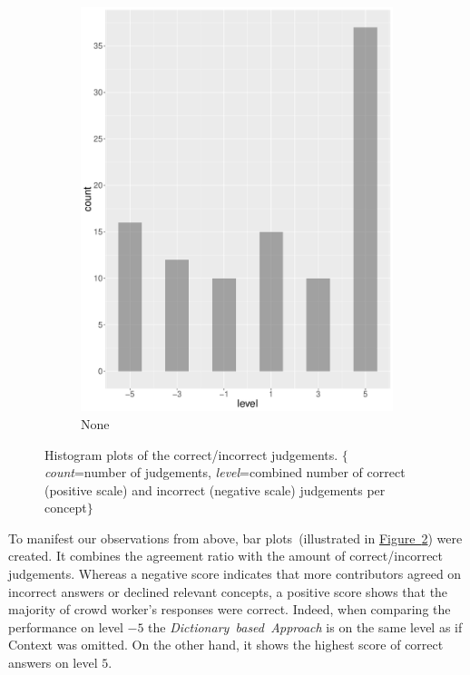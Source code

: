 \begin{figure}
\begin{subfigure}[b]{0.4\textwidth}
        \includegraphics[width=\textwidth]{plots/climate_change/hist_level_none}
        \caption{None}
        \label{fig:hist_level_climate_change_none}
    \end{subfigure}
    \caption{Histogram plots of the correct/incorrect judgements. $\{$\emph{count}=number of judgements, \emph{level}=combined number of correct (positive scale) and incorrect (negative scale) judgements per concept$\}$ }
	\label{fig:hist_level_climate_change_all}
\end{figure}

To manifest our observations from above, bar plots~(illustrated in \hyperref[fig:hist_level_climate_change_all]{Figure~\ref*{fig:hist_level_climate_change_all}}) were created. It combines the agreement ratio with the amount of correct/incorrect judgements. Whereas a negative score indicates that more contributors agreed on incorrect answers or declined relevant concepts, a positive score shows that the majority of crowd worker's responses were correct. Indeed, when comparing the performance on level $-5$ the \emph{Dictionary~based~Approach} is on the same level as if Context was omitted. On the other hand, it shows the highest score of correct answers on level $5$.

